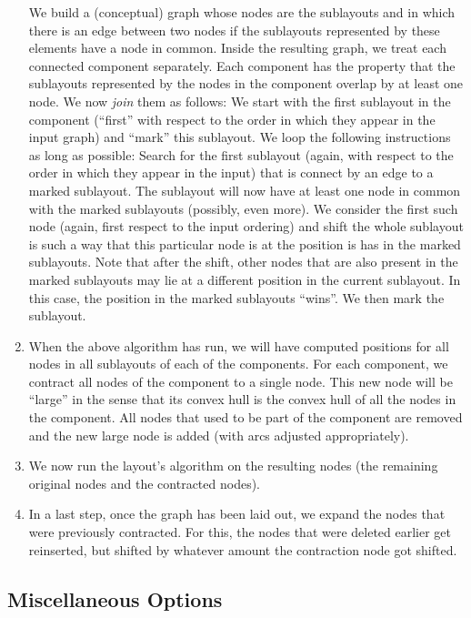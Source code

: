 \begin{enumerate}
        We build a (conceptual) graph whose nodes are the sublayouts and in
        which there is an edge between two nodes if the sublayouts represented
        by these elements have a node in common. Inside the resulting graph, we
        treat each connected component separately. Each component has the
        property that the sublayouts represented by the nodes in the component
        overlap by at least one node. We now \emph{join} them as follows: We
        start with the first sublayout in the component (``first'' with respect
        to the order in which they appear in the input graph) and ``mark'' this
        sublayout. We loop the following instructions as long as possible:
        Search for the first sublayout (again, with respect to the order in
        which they appear in the input) that is connect by an edge to a marked
        sublayout. The sublayout will now have at least one node in common with
        the marked sublayouts (possibly, even more). We consider the first such
        node (again, first respect to the input ordering) and shift the whole
        sublayout is such a way that this particular node is at the position is
        has in the marked sublayouts. Note that after the shift, other nodes
        that are also present in the marked sublayouts may lie at a different
        position in the current sublayout. In this case, the position in the
        marked sublayouts ``wins''. We then mark the sublayout.
    \item When the above algorithm has run, we will have computed positions for
        all nodes in all sublayouts of each of the components. For each
        component, we contract all nodes of the component to a single node.
        This new node will be ``large'' in the sense that its convex hull is
        the convex hull of all the nodes in the component. All nodes that used
        to be part of the component are removed and the new large node is added
        (with arcs adjusted appropriately).
    \item We now run the layout's algorithm on the resulting nodes (the
        remaining original nodes and the contracted nodes).
    \item In a last step, once the graph has been laid out, we expand the nodes
        that were previously contracted. For this, the nodes that were deleted
        earlier get reinserted, but shifted by whatever amount the contraction
        node got shifted.
\end{enumerate}


\subsection{Miscellaneous Options}

